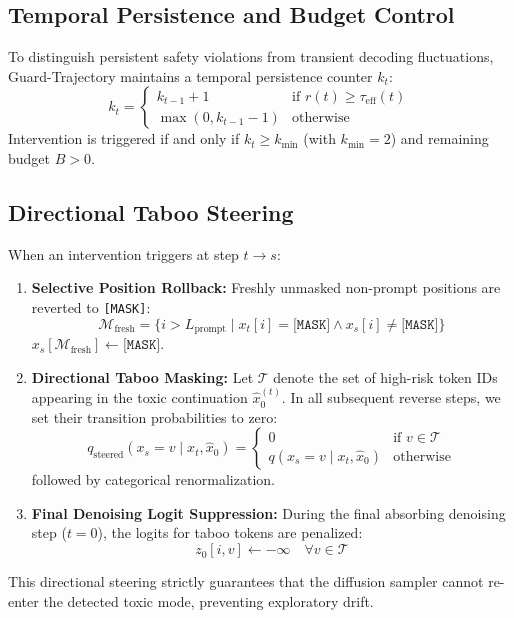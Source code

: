 \documentclass[11pt]{article}
\begin{document}
\subsection{Temporal Persistence and Budget Control}
To distinguish persistent safety violations from transient decoding fluctuations, Guard-Trajectory maintains a temporal persistence counter $k_t$:
\begin{equation}
k_t = \begin{cases}
k_{t-1} + 1 & \text{if } r(t) \ge \tau_{\text{eff}}(t) \\
\max(0, k_{t-1} - 1) & \text{otherwise}
\end{cases}
\end{equation}
Intervention is triggered if and only if $k_t \ge k_{\min}$ (with $k_{\min}=2$) and remaining budget $B > 0$.

\subsection{Directional Taboo Steering}
When an intervention triggers at step $t \to s$:
\begin{enumerate}
    \item \textbf{Selective Position Rollback:} Freshly unmasked non-prompt positions are reverted to \texttt{[MASK]}:
    \begin{equation}
    \mathcal{M}_{\text{fresh}} = \{ i > L_{\text{prompt}} \mid x_t[i] = \texttt{[MASK]} \land x_s[i] \ne \texttt{[MASK]} \}
    \end{equation}
    $x_s[\mathcal{M}_{\text{fresh}}] \leftarrow \texttt{[MASK]}$.
    \item \textbf{Directional Taboo Masking:} Let $\mathcal{T}$ denote the set of high-risk token IDs appearing in the toxic continuation $\hat{x}_0^{(t)}$. In all subsequent reverse steps, we set their transition probabilities to zero:
    \begin{equation}
    q_{\text{steered}}(x_s = v \mid x_t, \hat{x}_0) = \begin{cases}
    0 & \text{if } v \in \mathcal{T} \\
    q(x_s = v \mid x_t, \hat{x}_0) & \text{otherwise}
    \end{cases}
    \end{equation}
    followed by categorical renormalization.
    \item \textbf{Final Denoising Logit Suppression:} During the final absorbing denoising step ($t=0$), the logits for taboo tokens are penalized:
    \begin{equation}
    z_0[i, v] \leftarrow -\infty \quad \forall v \in \mathcal{T}
    \end{equation}
\end{enumerate}
This directional steering strictly guarantees that the diffusion sampler cannot re-enter the detected toxic mode, preventing exploratory drift.
\end{document}
